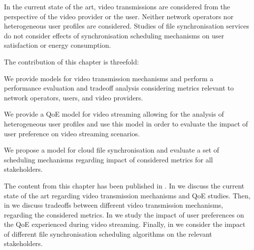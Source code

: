 In the current state of the art, video transmissions are considered from the perspective of the video provider or the user. 
Neither network operators nor heterogeneous user profiles are considered.
Studies of file synchronisation services do not consider effects of synchronisation scheduling mechanisms on user satisfaction or energy consumption.  

The contribution of this chapter is threefold:
\begin{enumerate*}
\item We provide models for video transmission mechanisms and perform a performance evaluation and tradeoff analysis considering metrics relevant to network operators, users, and video providers.
\item We provide a \gls{QoE} model for video streaming allowing for the analysis of heterogeneous user profiles and use this model in order to evaluate the impact of user preference on video streaming scenarios.
\item We propose a model for cloud file synchronisation and evaluate a set of scheduling mechanisms regarding impact of considered metrics for all stakeholders.
\end{enumerate*}

The content from this chapter has been published in \cite{Schwartz2013b, Hossfeld2015, Schwartz2014a}.
In  we discuss the current state of the art regarding video transmission mechanisms and \gls{QoE} studies.
Then, in  we discuss tradeoffs between different video transmission mechanisms, regarding the considered metrics.
In  we study the impact of user preferences on the \gls{QoE} experienced during video streaming.
Finally, in  we consider the impact of different file synchronisation scheduling algorithms on the relevant stakeholders.





